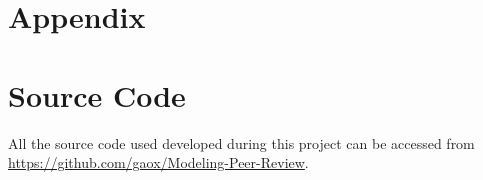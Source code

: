 \documentclass[11pt]{article}
\begin{document}
\newpage

\section{Appendix}
\appendix
\section{Source Code}
All the source code used developed during this project can be accessed from \url{https://github.com/gaox/Modeling-Peer-Review}.



























\end{document}
